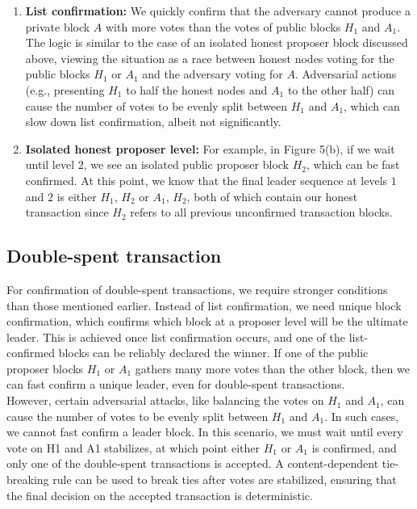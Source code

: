 \begin{enumerate}
	\item \textbf{List confirmation:} We quickly confirm that the adversary cannot produce a private block $A$ with more votes than the votes of public blocks $H_{1}$ and $A_{1}$. The logic is similar to the case of an isolated honest proposer block discussed above, viewing the situation as a race between honest nodes voting for the public blocks $H_{1}$ or $A_{1}$ and the adversary voting for $A$. Adversarial actions (e.g., presenting $H_{1}$ to half the honest nodes and $A_{1}$ to the other half) can cause the number of votes to be evenly split between $H_{1}$ and $A_{1}$, which can slow down list confirmation, albeit not significantly.
	\item \textbf{Isolated honest proposer level:} For example, in Figure 5(b), if we wait until level $2$, we see an isolated public proposer block $H_{2}$, which can be fast confirmed. At this point, we know that the final leader sequence at levels $1$ and $2$ is either $H_{1}$, $H_{2}$ or $A_{1}$, $H_{2}$, both of which contain our honest transaction since $H_{2}$ refers to all previous unconfirmed transaction blocks.
\end{enumerate}
\subsection{Double-spent transaction}
For confirmation of double-spent transactions, we require stronger conditions than those mentioned earlier. Instead of list confirmation, we need unique block confirmation, which confirms which block at a proposer level will be the ultimate leader. This is achieved once list confirmation occurs, and one of the list-confirmed blocks can be reliably declared the winner. If one of the public proposer blocks $H_{1}$ or $A_{1}$ gathers many more votes than the other block, then we can fast confirm a unique leader, even for double-spent transactions.\\
However, certain adversarial attacks, like balancing the votes on $H_{1}$ and $A_{1}$, can cause the number of votes to be evenly split between $H_{1}$ and $A_{1}$. In such cases, we cannot fast confirm a leader block. In this scenario, we must wait until every vote on H1 and A1 stabilizes, at which point either $H_{1}$ or $A_{1}$ is confirmed, and only one of the double-spent transactions is accepted. A content-dependent tie-breaking rule can be used to break ties after votes are stabilized, ensuring that the final decision on the accepted transaction is deterministic.
